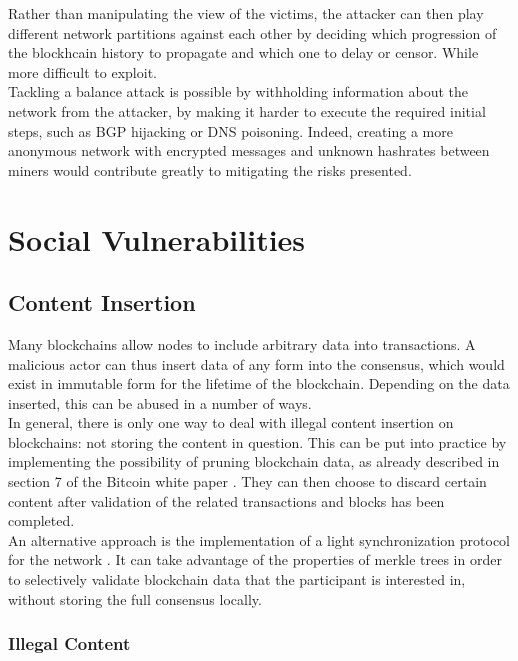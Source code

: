 \documentclass[12pt,a4paper]{article}
\begin{document}
Rather than manipulating the view of the victims, the attacker can then play different network partitions against each other by deciding which progression of the blockhcain history to propagate and which one to delay or censor. While more difficult to exploit.\\

Tackling a balance attack is possible by withholding information about the network from the attacker, by making it harder to execute the required initial steps, such as BGP hijacking or DNS poisoning. Indeed, creating a more anonymous network with encrypted messages and unknown \gls{hashrate}s between miners would contribute greatly to mitigating the risks presented.\\

\section{Social Vulnerabilities}

\subsection{Content Insertion}

Many \gls{blockchain}s allow nodes to include arbitrary data into transactions. A malicious actor can thus insert data of any form into the \gls{consensus}, which would exist in immutable form for the lifetime of the \gls{blockchain}. Depending on the data inserted, this can be abused in a number of ways.\\

In general, there is only one way to deal with illegal content insertion on \gls{blockchain}s: not storing the content in question. This can be put into practice by implementing the possibility of pruning blockchain data, as already described in section 7 of the Bitcoin white paper \cite{bitcoin}. They can then choose to discard certain content after validation of the related transactions and blocks has been completed.\\

An alternative approach is the implementation of a light synchronization protocol for the network \cite{light}. It can take advantage of the properties of merkle trees in order to selectively validate blockchain data that the participant is interested in, without storing the full \gls{consensus} locally.\\

\subsubsection{Illegal Content}
\end{document}
